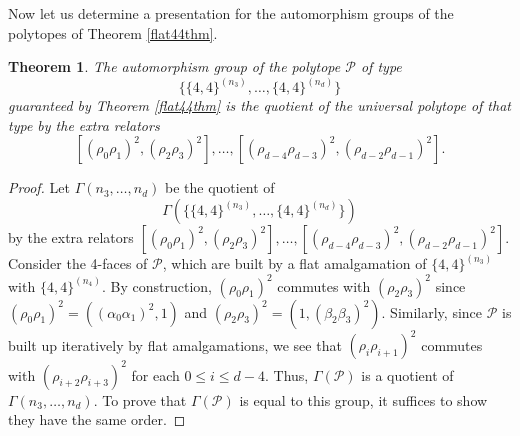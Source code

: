 \documentclass[12pt]{amsart}
\newcommand{\calP}{\ensuremath{\mathcal{P}}}
\newcommand{\G}{\Gamma}
\newtheorem{theorem}{Theorem}[section]
\theoremstyle{definition}
\begin{document}
	Now let us determine a presentation for the automorphism groups of the polytopes of Theorem \ref{flat44thm}. 
	
	\begin{theorem}
	The automorphism group of the polytope $\calP$ of type 
	\[ \{ \{4,4\}^{(n_3)}, \ldots, \{4,4\}^{(n_d)} \} \]	
	guaranteed by Theorem \ref{flat44thm} is the quotient of the universal polytope of that type by the extra relators
	\[ [(\rho_0 \rho_1)^2, (\rho_2 \rho_3)^2], \ldots, [(\rho_{d-4} \rho_{d-3})^2, (\rho_{d-2} \rho_{d-1})^2]. \]
	\end{theorem}		
	
	\begin{proof}
	Let $\G(n_3, \ldots, n_d)$ be the quotient of 
	\[ \G(\{ \{4,4\}^{(n_3)}, \ldots, \{4, 4\}^{(n_d)} \}) \]
	by the extra relators  $[(\rho_0 \rho_1)^2, (\rho_2 \rho_3)^2], \ldots, [(\rho_{d-4} \rho_{d-3})^2, (\rho_{d-2} \rho_{d-1})^2]$. Consider the 4-faces of $\calP$, which are built by a flat amalgamation of $\{4,4\}^{(n_3)}$ with $\{4,4\}^{(n_4)}$. By construction, $(\rho_0 \rho_1)^2$ commutes with $(\rho_2 \rho_3)^2$ since $(\rho_0 \rho_1)^2 = ( (\alpha_0 \alpha_1)^2, 1)$ and $(\rho_2 \rho_3)^2 = (1, (\beta_2 \beta_3)^2)$. Similarly, since $\calP$ is built up iteratively by flat amalgamations, we see that $(\rho_i \rho_{i+1})^2$ commutes with $(\rho_{i+2} \rho_{i+3})^2$ for each $0 \leq i \leq d-4$. Thus, $\G(\calP)$ is a quotient of $\G(n_3, \ldots, n_d)$. To prove that $\G(\calP)$ is equal to this group, it suffices to show they have the same order.
	

\end{proof}
\end{document}
